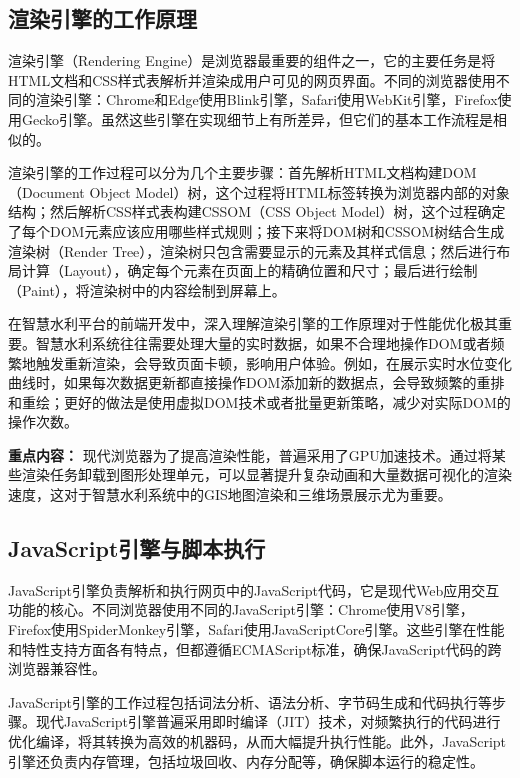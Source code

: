 \subsection{渲染引擎的工作原理}\label{ux6e32ux67d3ux5f15ux64ceux7684ux5de5ux4f5cux539fux7406}

渲染引擎（Rendering Engine）是浏览器最重要的组件之一，它的主要任务是将HTML文档和CSS样式表解析并渲染成用户可见的网页界面。不同的浏览器使用不同的渲染引擎：Chrome和Edge使用Blink引擎，Safari使用WebKit引擎，Firefox使用Gecko引擎。虽然这些引擎在实现细节上有所差异，但它们的基本工作流程是相似的。

渲染引擎的工作过程可以分为几个主要步骤：首先解析HTML文档构建DOM（Document Object Model）树，这个过程将HTML标签转换为浏览器内部的对象结构；然后解析CSS样式表构建CSSOM（CSS Object Model）树，这个过程确定了每个DOM元素应该应用哪些样式规则；接下来将DOM树和CSSOM树结合生成渲染树（Render Tree），渲染树只包含需要显示的元素及其样式信息；然后进行布局计算（Layout），确定每个元素在页面上的精确位置和尺寸；最后进行绘制（Paint），将渲染树中的内容绘制到屏幕上。

在智慧水利平台的前端开发中，深入理解渲染引擎的工作原理对于性能优化极其重要。智慧水利系统往往需要处理大量的实时数据，如果不合理地操作DOM或者频繁地触发重新渲染，会导致页面卡顿，影响用户体验。例如，在展示实时水位变化曲线时，如果每次数据更新都直接操作DOM添加新的数据点，会导致频繁的重排和重绘；更好的做法是使用虚拟DOM技术或者批量更新策略，减少对实际DOM的操作次数。

\textbf{重点内容：} 现代浏览器为了提高渲染性能，普遍采用了GPU加速技术。通过将某些渲染任务卸载到图形处理单元，可以显著提升复杂动画和大量数据可视化的渲染速度，这对于智慧水利系统中的GIS地图渲染和三维场景展示尤为重要。

\subsection{JavaScript引擎与脚本执行}\label{javascriptux5f15ux64ceux4e0eux811aux672cux6267ux884c}

JavaScript引擎负责解析和执行网页中的JavaScript代码，它是现代Web应用交互功能的核心。不同浏览器使用不同的JavaScript引擎：Chrome使用V8引擎，Firefox使用SpiderMonkey引擎，Safari使用JavaScriptCore引擎。这些引擎在性能和特性支持方面各有特点，但都遵循ECMAScript标准，确保JavaScript代码的跨浏览器兼容性。

JavaScript引擎的工作过程包括词法分析、语法分析、字节码生成和代码执行等步骤。现代JavaScript引擎普遍采用即时编译（JIT）技术，对频繁执行的代码进行优化编译，将其转换为高效的机器码，从而大幅提升执行性能。此外，JavaScript引擎还负责内存管理，包括垃圾回收、内存分配等，确保脚本运行的稳定性。

